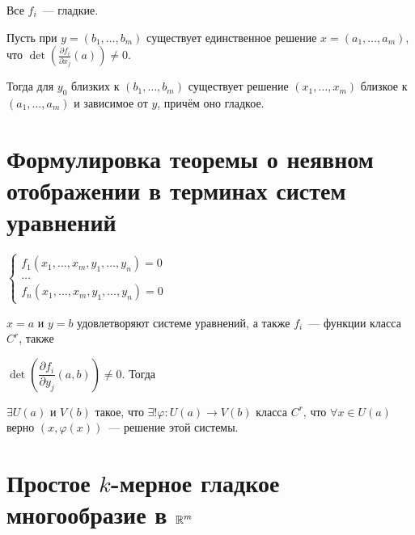 \documentclass{article}
\begin{document}
        Все $f_i$~--- гладкие.
        
        Пусть при $y = (b_1, \ldots, b_m)$ существует единственное решение $x = (a_1, \ldots, a_m)$, что $\det \left( \frac{\partial f_i}{\partial x_j} (a) \right) \neq 0$.
        
        Тогда для $y_0$ близких к $(b_1, \ldots, b_m)$ существует решение $(x_1, \ldots, x_m)$ близкое к $(a_1, \ldots, a_m)$ и зависимое от $y$, причём оно гладкое.
        
    \newpage
    
    \section{Формулировка теоремы о неявном отображении в терминах систем уравнений}
    
    $
            \begin{cases}
            
                f_1(x_1, \ldots, x_m, y_1, \ldots, y_n) = 0 \\
                
                \ldots \\
                
                f_n(x_1, \ldots, x_m, y_1, \ldots, y_n) = 0
                
            \end{cases}
    $
        
        $x = a$ и $y = b$ удовлетворяют системе уравнений, а также $f_i$~--- функции класса $C^r$, также
        
        $\det \left( \dfrac{\partial f_i}{\partial y_j} (a, b) \right) \neq 0$. Тогда
        
        $\exists U(a)$ и $V(b)$ такое, что $\exists ! \varphi: U(a) \rightarrow V(b)$ класса $C^r$, что $\forall x \in U(a)$ верно $(x, \varphi(x))$~--- решение этой системы.
        
    \newpage
    
    \section{Простое $k$-мерное гладкое многообразие в $\mathbb{R}^m$}
            
\end{document}
